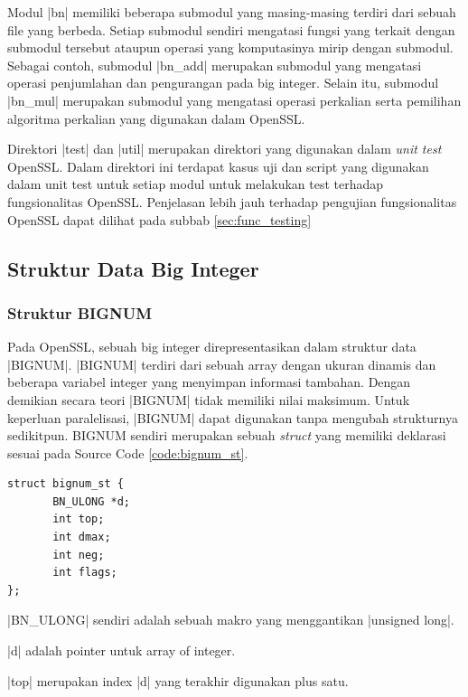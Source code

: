     Modul |bn| memiliki beberapa submodul yang masing-masing terdiri dari sebuah file yang berbeda. Setiap submodul sendiri mengatasi fungsi yang terkait dengan submodul tersebut ataupun operasi yang komputasinya mirip dengan submodul. Sebagai contoh, submodul |bn_add| merupakan submodul yang mengatasi operasi penjumlahan dan pengurangan pada big integer. Selain itu, submodul |bn_mul| merupakan submodul yang mengatasi operasi perkalian serta pemilihan algoritma perkalian yang digunakan dalam OpenSSL.

    Direktori |test| dan |util| merupakan direktori yang digunakan dalam \textit{unit test} OpenSSL. Dalam direktori ini terdapat kasus uji dan script yang digunakan dalam unit test untuk setiap modul untuk melakukan test terhadap fungsionalitas OpenSSL. Penjelasan lebih jauh terhadap pengujian fungsionalitas OpenSSL dapat dilihat pada subbab \ref{sec:func_testing}

  \subsection{Struktur Data Big Integer} \label{sec:bignum_struct}
  \subsubsection{Struktur BIGNUM}

    Pada OpenSSL, sebuah big integer direpresentasikan dalam struktur data |BIGNUM|. |BIGNUM| terdiri dari sebuah array dengan ukuran dinamis dan beberapa variabel integer yang menyimpan informasi tambahan. Dengan demikian secara teori |BIGNUM| tidak memiliki nilai maksimum. Untuk keperluan paralelisasi, |BIGNUM| dapat digunakan tanpa mengubah strukturnya sedikitpun. BIGNUM sendiri merupakan sebuah \textit{struct} yang memiliki deklarasi sesuai pada Source Code \ref{code:bignum_st}.

    \begin{lstlisting}[caption={Struktur Data bignum},captionpos=b, label={code:bignum_st}]
struct bignum_st {
       BN_ULONG *d;
       int top;
       int dmax;
       int neg;
       int flags;
};
    \end{lstlisting}

    |BN_ULONG| sendiri adalah sebuah makro yang menggantikan |unsigned long|.

    |d| adalah pointer untuk array of integer.

    |top| merupakan index |d| yang terakhir digunakan plus satu.

